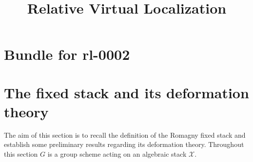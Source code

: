 \documentclass[12pt,dvipsnames]{amsart}
\title{Relative Virtual Localization}
\begin{document}
\section*{Bundle for rl-0002}

\section{The fixed stack and its deformation theory}\label{rl-0002}

The aim of this section is to recall the definition of the Romagny fixed stack and establish some preliminary results regarding its deformation theory. Throughout this section \(G\) is a group scheme acting on an algebraic stack \(\mathcal X\).





\end{document}
